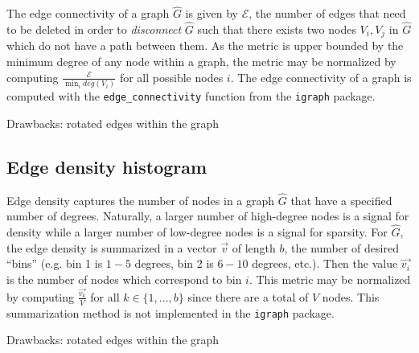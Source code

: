 The edge connectivity of a graph $\hat{G}$ is given by $\mathcal{E}$, the 
number of edges that need to be deleted in order to \textit{disconnect} 
$\hat{G}$ such that there exists two nodes $V_i,V_j$ in $\hat{G}$ which do not 
have a path between them.
As the metric is upper bounded by the minimum 
degree of any node within a graph, the metric may be normalized by computing 
$\frac{\mathcal{E}}{\min_i deg(V_i)}$ for all possible nodes $i$.
The edge connectivity of a graph is computed 
with the \texttt{edge\_connectivity} function from the \texttt{igraph} package. 

Drawbacks: rotated edges within the graph

\subsection{Edge density histogram}

Edge density captures the number of nodes in a graph $\hat{G}$ that have a 
specified number of degrees. Naturally, a larger number of high-degree nodes is 
a signal for density while a larger number of low-degree nodes is a signal for 
sparsity. For $\hat{G}$, the edge density is summarized in a 
vector $\overrightarrow{v}$ of length $b$, the number of desired ``bins'' 
(e.g. bin 1 is $1-5$ degrees, bin 2 is $6-10$ degrees, etc.). Then the value 
$\overrightarrow{v_i}$ is the number of nodes which correspond to bin $i$. This 
metric may be normalized by computing $\frac{\overrightarrow{v_k}}{V}$ for 
all $k \in \{1,...,b\}$ since there are a total of $V$ nodes. 
This summarization method is not implemented in the \texttt{igraph} package. 

Drawbacks: rotated edges within the graph